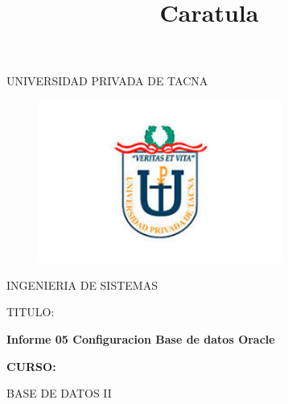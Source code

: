 \documentclass[12pt,letterpaper]{article}
\begin{document}
%


\title{Caratula}

\begin{titlepage}
\begin{center}
\large{UNIVERSIDAD PRIVADA DE TACNA}\\
\vspace*{-0.025in}
\begin{figure}[htb]
\begin{center}
\includegraphics[width=8cm]{./Imagenes/logo}
\end{center}
\end{figure}
\vspace*{0.15in}
INGENIERIA DE SISTEMAS  \\

\vspace*{0.5in}
\begin{large}
TITULO:\\
\end{large}

\vspace*{0.1in}
\begin{Large}
\textbf{Informe 05 Configuracion Base de datos Oracle} \\
\end{Large}

\vspace*{0.3in}
\begin{Large}
\textbf{CURSO:} \\
\end{Large}

\vspace*{0.1in}
\begin{large}
BASE DE DATOS II\\
\end{large}


\end{center}
\end{titlepage}
\end{document}
